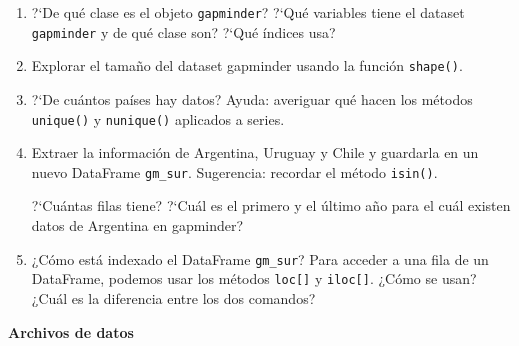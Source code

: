 \documentclass[a4paper,11pt]{article}
\theoremstyle{definition}
\begin{document}
\begin{enumerate}[resume]
    Cargar la biblioteca \lstinline{gapminder} utilizando
\begin{lstlisting}
from gapminder import gapminder
\end{lstlisting}
Si da error es posible que no est\'e instalado. En tal caso ejecuten primero
\begin{lstlisting}
pip install gapminder
\end{lstlisting}
Esto crea un nuevo objeto \lstinline{gapminder}. Pueden ver el contenido con el comando con algunos de estos comandos: \lstinline{display(gapminder)}, \lstinline{gapminder.info()}, \lstinline{gapminder.head()}, \lstinline{gapminder.tail()}.

\item ?`De qué clase es el objeto \lstinline{gapminder}? ?`Qu\'e variables tiene el dataset \lstinline{gapminder} y de qu\'e clase son? ?`Qu\'e \'indices usa?

\item Explorar el tama\~no del dataset gapminder usando la función \lstinline{shape()}.

\item ?`De cu\'antos pa\'ises hay datos? Ayuda: averiguar qu\'e hacen los métodos \lstinline{unique()} y \lstinline{nunique()} aplicados a series.



\item Extraer la informaci\'on de Argentina, Uruguay y Chile y guardarla en un nuevo DataFrame \lstinline{gm_sur}. Sugerencia: recordar el método \lstinline{isin()}.

?`Cu\'antas filas tiene? ?`Cu\'al es el primero y el \'ultimo a\~no para el cu\'al existen datos de Argentina en gapminder?

\item ¿Cómo está indexado el DataFrame \lstinline{gm_sur}? Para acceder a una fila de un DataFrame, podemos usar los métodos \lstinline{loc[]} y \lstinline{iloc[]}. ¿Cómo se usan? ¿Cuál es la diferencia entre los dos comandos?


\end{enumerate}

\textbf{\large Archivos de datos}
\end{document}
